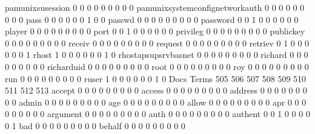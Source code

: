 \documentclass[compress,8pt]{beamer}
\begin{document}
\begin{frame}
\begin{Schunk}
  pamunixsusession                           0   0   0   0   0   0   0   0   0
  pamunixsystemconfignetworkauth             0   0   0   0   0   0   0   0   0
  pass                                       0   0   0   0   0   0   1   0   0
  passwd                                     0   0   0   0   0   0   0   0   0
  password                                   0   0   1   0   0   0   0   0   0
  player                                     0   0   0   0   0   0   0   0   0
  port                                       0   0   1   0   0   0   0   0   0
  privileg                                   0   0   0   0   0   0   0   0   0
  publickey                                  0   0   0   0   0   0   0   0   0
  receiv                                     0   0   0   0   0   0   0   0   0
  request                                    0   0   0   0   0   0   0   0   0
  retriev                                    0   1   0   0   0   0   0   0   1
  rhost                                      1   0   0   0   0   0   0   1   0
  rhostapsupsrvbasnet                        0   0   0   0   0   0   0   0   0
  richard                                    0   0   0   0   0   0   0   0   0
  richarduid                                 0   0   0   0   0   0   0   0   0
  root                                       0   0   0   0   0   0   0   0   0
  roy                                        0   0   0   0   0   0   0   0   0
  run                                        0   0   0   0   0   0   0   0   0
  ruser                                      1   0   0   0   0   0   0   1   0
                                          Docs
Terms                                      505 506 507 508 509 510 511 512 513
  accept                                     0   0   0   0   0   0   0   0   0
  access                                     0   0   0   0   0   0   0   0   0
  address                                    0   0   0   0   0   0   0   0   0
  admin                                      0   0   0   0   0   0   0   0   0
  age                                        0   0   0   0   0   0   0   0   0
  allow                                      0   0   0   0   0   0   0   0   0
  apr                                        0   0   0   0   0   0   0   0   0
  argument                                   0   0   0   0   0   0   0   0   0
  auth                                       0   0   0   0   0   0   0   0   0
  authent                                    0   0   1   0   0   0   0   0   1
  bad                                        0   0   0   0   0   0   0   0   0
  behalf                                     0   0   0   0   0   0   0   0   0

\end{Schunk}
\end{frame}
\end{document}
